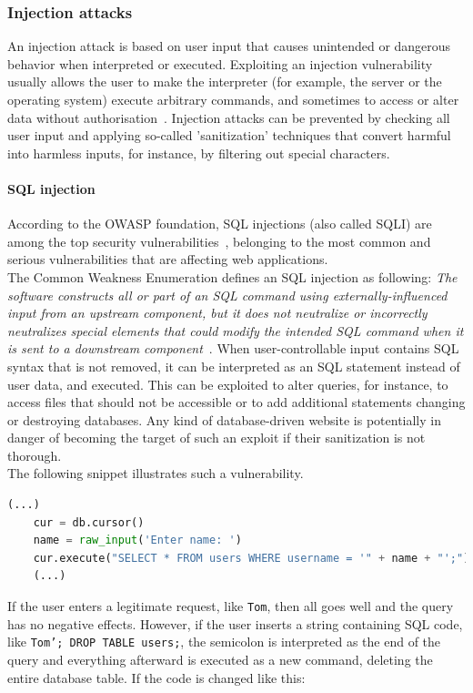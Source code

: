 \documentclass[
a4paper,
pagesize,
pdftex,
12pt,
twoside, %
BCOR=5mm, %
ngerman,
fleqn,
final,
]{scrartcl}
\begin{document}
	\subsubsection{Injection attacks}
	An injection attack is based on user input that causes unintended or dangerous behavior when interpreted or executed. Exploiting an injection vulnerability usually allows the user to make the interpreter (for example, the server or the operating system) execute arbitrary commands, and sometimes to access or alter data without authorisation~\cite{Micheelsen.2016}. Injection attacks can be prevented by checking all user input and applying so-called 'sanitization' techniques that convert harmful into harmless inputs, for instance, by filtering out special characters. 
	\paragraph{SQL injection}
	According to the OWASP foundation, SQL injections (also called SQLI) are among the top security vulnerabilities~\cite{OWASPFoundation.}, belonging to the most common and serious vulnerabilities that are affecting web applications.\\ 
	The Common Weakness Enumeration defines an SQL injection as following: \textit{The software constructs all or part of an SQL command using externally-influenced input from an upstream component, but it does not neutralize or incorrectly neutralizes special elements that could modify the intended SQL command when it is sent to a downstream component}~\cite{CommonWeaknessEnumeration.19.9.2019}. When user-controllable input contains SQL syntax that is not removed, it can be interpreted as an SQL statement instead of user data, and executed. This can be exploited to alter queries, for instance, to access files that should not be accessible or to add additional statements changing or destroying databases. Any kind of database-driven website is potentially in danger of becoming the target of such an exploit if their sanitization is not thorough.\\
	The following snippet illustrates such a vulnerability.
	\begin{lstlisting}[language=Python,showstringspaces=false]
	(...)
	cur = db.cursor()
	name = raw_input('Enter name: ')
	cur.execute("SELECT * FROM users WHERE username = '" + name + "';")
	(...)
	\end{lstlisting}
	If the user enters a legitimate request, like \texttt{Tom}, then all goes well and the query has no negative effects. However, if the user inserts a string containing SQL code, like \texttt{Tom'; DROP TABLE users;}, the semicolon is interpreted as the end of the query and everything afterward is executed as a new command, deleting the entire database table. If the code is changed like this:
\end{document}
